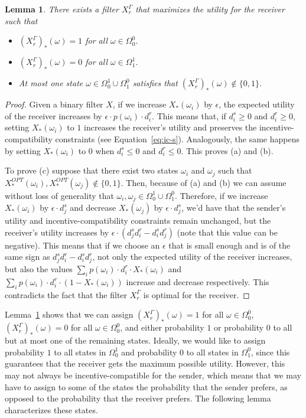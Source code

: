 \documentclass[submission,copyright,creativecommons]{eptcs}
\newtheorem{lemma}{Lemma}
\begin{document}
\begin{lemma}\label{lem:char-values1}
There exists a filter $X_r^\Gamma$ that maximizes the utility for the receiver such that
\begin{itemize}
\item[(a)] $(X_r^\Gamma)_*(\omega) = 1$ for all $\omega \in \Omega_0^0$.
\item[(b)] $(X_r^\Gamma)_*(\omega) = 0$ for all $\omega \in \Omega_1^1$.
\item[(c)] At most one state $\omega \in \Omega_0^1 \cup \Omega_1^0$ satisfies that $(X_r^\Gamma)_*(\omega) \not \in \{0,1\}$. 
\end{itemize}
\end{lemma}

\begin{proof}
Given a binary filter $X$, if we increase $X_*(\omega_i)$ by $\epsilon$, the expected utility of the receiver increases by $\epsilon \cdot  p(\omega_i) \cdot d_i^r$. This means that, if $d_i^s \ge 0$ and $d_i^r \ge 0$, setting $X_*(\omega_i)$ to $1$ increases the receiver's utility and preserves the incentive-compatibility constraints (see Equation~\ref{eq:ic-s}). Analogously, the same happens by setting $X_*(\omega_i)$ to $0$ when $d_i^s \le 0$ and $d_i^r \le 0$. This proves (a) and (b).

To prove (c) suppose that there exist two states $\omega_i$ and $\omega_j$ such that $X_*^{OPT}(\omega_i), X_*^{OPT}(\omega_j) \not \in \{0,1\}$. Then, because of (a) and (b) we can assume without loss of generality that $\omega_i, \omega_j \in \Omega_0^1 \cup \Omega_1^0$. %
Therefore, if we increase $X_*(\omega_i)$ by $\epsilon \cdot d_j^s$ and decrease $X_*(\omega_j)$ by $\epsilon \cdot d_j^s$, we'd have that the sender's utility and incentive-compatibility constraints remain unchanged, but the receiver's utility increases by $\epsilon \cdot  (d_j^s d_i^r - d_i^s d_j^r)$ (note that this value can be negative). This means that if we choose an $\epsilon$ that is small enough and is of the same sign as $d_j^s d_i^r - d_i^s d_j^r$, not only the expected utility of the receiver increases, but also the values $\sum_i p(\omega_i) \cdot d_i^r \cdot X_*(\omega_i)$ and $\sum_i p(\omega_i) \cdot d_i^r \cdot (1 - X_*(\omega_i))$ increase and decrease respectively. This contradicts the fact that the filter $X_r^\Gamma$ is optimal for the receiver.
\end{proof}

Lemma~\ref{lem:char-values1} shows that we can assign $(X_r^\Gamma)_*(\omega) = 1$ for all $\omega \in \Omega_0^0$, $(X_r^\Gamma)_*(\omega) = 0$ for all $\omega \in \Omega_0^0$, and  either probability $1$ or probability $0$ to all but at most one of the remaining states. Ideally, we would like to assign probability $1$ to all states in $\Omega_0^1$ and probability $0$ to all states in $\Omega_1^0$, since this guarantees that the receiver gets the maximum possible utility. However, this may not always be incentive-compatible for the sender, which means that we may have to assign to some of the states the probability that the sender prefers, as opposed to the probability that the receiver prefers. The following lemma characterizes these states.
\end{document}
